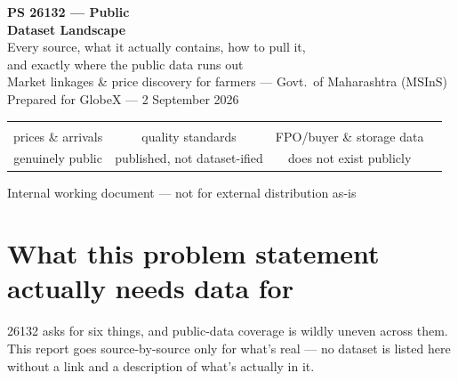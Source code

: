 \documentclass[11pt]{article}
\newcommand{\yes}{{\color{gxgreen}\ding{108}}}
\newcommand{\pmid}{{\color{gxcyan}\ding{109}}}
\newcommand{\bld}{{\color{gxamber}\ding{53}}}
\begin{document}
\begin{titlepage}
\centering
\vspace*{1.8cm}
{\Huge\bfseries\color{gxteal} PS 26132 --- Public}\\[0.4em]
{\Huge\bfseries\color{gxteal} Dataset Landscape}\\[1.8em]
{\Large\color{gxslate} Every source, what it actually contains, how to pull it,}\\[0.3em]
{\Large\color{gxslate} and exactly where the public data runs out}\\[3em]
{\normalsize\color{gxslate} Market linkages \& price discovery for farmers --- Govt.\ of Maharashtra (MSInS)}\\[0.3em]
{\normalsize\color{gxslate} Prepared for GlobeX --- 2 September 2026}\\[2.6em]
\begin{tabular}{cccc}
\textbf{\color{gxgreen}\Large \yes} & \textbf{\color{gxcyan}\Large \pmid} & \textbf{\color{gxamber}\Large \bld} & \\
{\small prices \& arrivals} & {\small quality standards} & {\small FPO/buyer \& storage data} & \\
{\small genuinely public} & {\small published, not dataset-ified} & {\small does not exist publicly} & \\
\end{tabular}
\vfill
{\footnotesize\color{gxslate} Internal working document --- not for external distribution as-is}
\end{titlepage}

\section{What this problem statement actually needs data for}
26132 asks for six things, and public-data coverage is wildly uneven across them. This report goes
source-by-source only for what's real --- no dataset is listed here without a link and a description of
what's actually in it.
\end{document}
